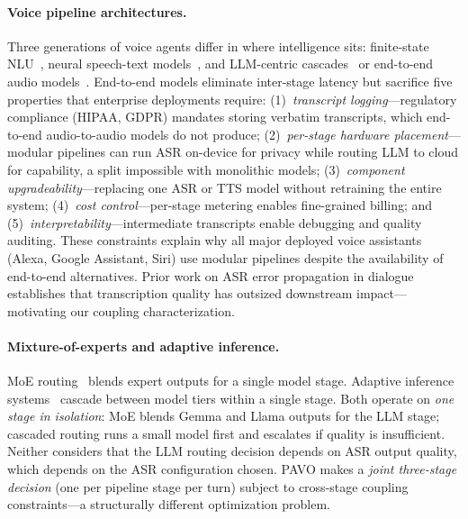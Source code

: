 \documentclass{article}
\begin{document}
\paragraph{Voice pipeline architectures.} Three generations of voice agents differ in where intelligence sits: finite-state NLU~\citep{stivers2009universals,young2013pomdp}, neural speech-text models~\citep{rubenstein2023audiopalm}, and LLM-centric cascades~\citep{defossez2024moshi,xie2024miniomni} or end-to-end audio models~\citep{openai2024gpt4o}. End-to-end models eliminate inter-stage latency but sacrifice five properties that enterprise deployments require: (1)~\emph{transcript logging}---regulatory compliance (HIPAA, GDPR) mandates storing verbatim transcripts, which end-to-end audio-to-audio models do not produce; (2)~\emph{per-stage hardware placement}---modular pipelines can run ASR on-device for privacy while routing LLM to cloud for capability, a split impossible with monolithic models; (3)~\emph{component upgradeability}---replacing one ASR or TTS model without retraining the entire system; (4)~\emph{cost control}---per-stage metering enables fine-grained billing; and (5)~\emph{interpretability}---intermediate transcripts enable debugging and quality auditing. These constraints explain why all major deployed voice assistants (Alexa, Google Assistant, Siri) use modular pipelines despite the availability of end-to-end alternatives. Prior work on ASR error propagation in dialogue~\citep{errattahi2018asr} establishes that transcription quality has outsized downstream impact---motivating our coupling characterization.

\paragraph{Mixture-of-experts and adaptive inference.} MoE routing~\citep{shazeer2017moe,jacobs1991mixture} blends expert outputs for a single model stage. Adaptive inference systems~\citep{snell2024scaling} cascade between model tiers within a single stage. Both operate on \emph{one stage in isolation}: MoE blends Gemma and Llama outputs for the LLM stage; cascaded routing runs a small model first and escalates if quality is insufficient. Neither considers that the LLM routing decision depends on ASR output quality, which depends on the ASR configuration chosen. PAVO makes a \emph{joint three-stage decision} (one per pipeline stage per turn) subject to cross-stage coupling constraints---a structurally different optimization problem.
\end{document}
